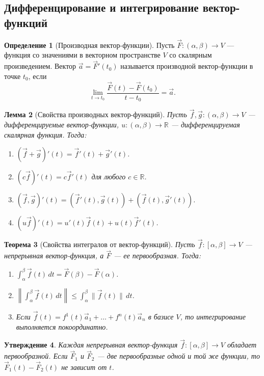 \documentclass[12pt,a4paper]{article}
\newtheorem{theorem}{Теорема}[section]
\newtheorem{lemma}[theorem]{Лемма}
\newtheorem{proposition}[theorem]{Утверждение}
\theoremstyle{definition}
\newtheorem{definition}[theorem]{Определение}
\begin{document}
\subsection{Дифференцирование и интегрирование вектор-функций}

\begin{definition}[Производная вектор-функции]
Пусть $\vec{F}: (\alpha, \beta) \to V$ --- функция со значениями в векторном пространстве $V$ со скалярным произведением. Вектор $\vec{a} = \vec{F}'(t_0)$ называется производной вектор-функции в точке $t_0$, если
$$\lim_{t \to t_0} \frac{\vec{F}(t) - \vec{F}(t_0)}{t - t_0} = \vec{a}.$$
\end{definition}

\begin{lemma}[Свойства производных вектор-функций]
Пусть $\vec{f}, \vec{g}: (\alpha, \beta) \to V$ --- дифференцируемые вектор-функции, $u: (\alpha, \beta) \to \mathbb{R}$ --- дифференцируемая скалярная функция. Тогда:
\begin{enumerate}
    \item $(\vec{f} + \vec{g})'(t) = \vec{f}'(t) + \vec{g}'(t)$.
    \item $(c\vec{f})'(t) = c\vec{f}'(t)$ для любого $c \in \mathbb{R}$.
    \item $(\vec{f}, \vec{g})'(t) = (\vec{f}'(t), \vec{g}(t)) + (\vec{f}(t), \vec{g}'(t))$.
    \item $(u\vec{f})'(t) = u'(t)\vec{f}(t) + u(t)\vec{f}'(t)$.
\end{enumerate}
\end{lemma}

\begin{theorem}[Свойства интегралов от вектор-функций]
Пусть $\vec{f}: [\alpha, \beta] \to V$ --- непрерывная вектор-функция, а $\vec{F}$ --- ее первообразная. Тогда:
\begin{enumerate}
    \item $\displaystyle \int_{\alpha}^{\beta} \vec{f}(t)\,dt = \vec{F}(\beta) - \vec{F}(\alpha)$.
    \item $\displaystyle \left\| \int_{\alpha}^{\beta} \vec{f}(t)\,dt \right\| \le \int_{\alpha}^{\beta} \|\vec{f}(t)\|\,dt$.
    \item Если $\vec{f}(t) = f^1(t)\vec{a}_1 + \dots + f^n(t)\vec{a}_n$ в базисе $V$, то интегрирование выполняется покоординатно.
\end{enumerate}
\end{theorem}

\begin{proposition}
Каждая непрерывная вектор-функция $\vec{f}: [\alpha, \beta] \to V$ обладает первообразной. Если $\vec{F}_1$ и $\vec{F}_2$ --- две первообразные одной и той же функции, то $\vec{F}_1(t) - \vec{F}_2(t)$ не зависит от $t$.
\end{proposition}
\end{document}
